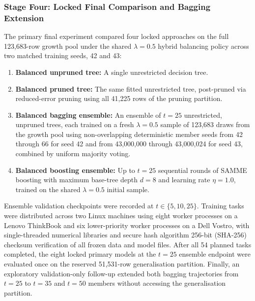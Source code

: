 \subsubsection{Stage Four: Locked Final Comparison and Bagging Extension}
The primary final experiment compared four locked approaches on the full 123,683-row growth pool under the shared $\lambda = 0.5$ hybrid balancing policy across two matched training seeds, 42 and 43:
\begin{enumerate}
    \item \textbf{Balanced unpruned tree:} A single unrestricted decision tree.
    \item \textbf{Balanced pruned tree:} The same fitted unrestricted tree, post-pruned via reduced-error pruning using all 41,225 rows of the pruning partition.
    \item \textbf{Balanced bagging ensemble:} An ensemble of $t = 25$ unrestricted, unpruned trees, each trained on a fresh $\lambda = 0.5$ sample of 123,683 draws from the growth pool using non-overlapping deterministic member seeds from 42 through 66 for seed 42 and from 43,000,000 through 43,000,024 for seed 43, combined by uniform majority voting.
    \item \textbf{Balanced boosting ensemble:} Up to $t = 25$ sequential rounds of SAMME boosting with maximum base-tree depth $d = 8$ and learning rate $\eta = 1.0$, trained on the shared $\lambda = 0.5$ initial sample.
\end{enumerate}
Ensemble validation checkpoints were recorded at $t \in \{5, 10, 25\}$. Training tasks were distributed across two Linux machines using eight worker processes on a Lenovo ThinkBook and six lower-priority worker processes on a Dell Vostro, with single-threaded numerical libraries and secure hash algorithm 256-bit (SHA-256) checksum verification of all frozen data and model files. After all 54 planned tasks completed, the eight locked primary models at the $t = 25$ ensemble endpoint were evaluated once on the reserved 51,531-row generalisation partition. Finally, an exploratory validation-only follow-up extended both bagging trajectories from $t = 25$ to $t = 35$ and $t = 50$ members without accessing the generalisation partition.
